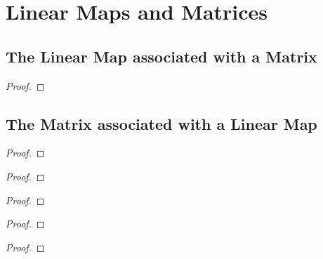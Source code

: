\chapter{Linear Maps and Matrices}

\section{The Linear Map associated with a Matrix}
\setcounter{exercise}{0}

\begin{exercise}
\end{exercise}

\begin{proof}
\end{proof}

\section{The Matrix associated with a Linear Map}
\setcounter{exercise}{0}

\begin{exercise}
\end{exercise}

\begin{proof}
\end{proof}

\begin{exercise}
\end{exercise}

\begin{proof}
\end{proof}

\begin{exercise}
\end{exercise}

\begin{proof}
\end{proof}

\begin{exercise}
\end{exercise}

\begin{proof}
\end{proof}

\begin{exercise}
\end{exercise}

\begin{proof}
\end{proof}

\begin{exercise}
\end{exercise}

